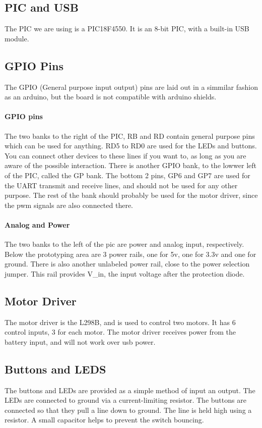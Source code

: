 \documentclass{article}
\begin{document}
\subsection{PIC and USB}
The PIC we are using is a PIC18F4550. It is an 8-bit PIC, with a built-in USB module.

\subsection{GPIO Pins}
The GPIO (General purpose input output) pins are laid out in a simmilar fashion as an arduino, but the board is not compatible with arduino shields.

\paragraph{GPIO pins}
The two banks to the right of the PIC, RB and RD contain general purpose pins which can be used for anything. RD5 to RD0 are used for the LEDs and buttons. You can connect other devices to these lines if you want to, as long as you are aware of the possible interaction. There is another GPIO bank, to the lowwer left of the PIC, called the GP bank. The bottom 2 pins, GP6 and GP7 are used for the UART transmit and receive lines, and should not be used for any other purpose. The rest of the bank should probably be used for the motor driver, since the pwm signals are also connected there.

\paragraph{Analog and Power}
The two banks to the left of the pic are power and analog input, respectively. Below the prototyping area are 3 power rails, one for 5v, one for 3.3v and one for ground. There is also another unlabeled power rail, close to the power selection jumper. This rail provides V\_in, the input voltage after the protection diode.

\subsection{Motor Driver}
The motor driver is the L298B, and is used to control two motors. It has 6 control inputs, 3 for each motor. The motor driver receives power from the battery input, and will not work over usb power.

\subsection{Buttons and LEDS}
The buttons and LEDs are provided as a simple method of input an output. The LEDs are connected to ground via a current-limiting resistor. The buttons are connected so that they pull a line down to ground. The line is held high using a resistor. A small capacitor helps to prevent the switch bouncing.
\end{document}
